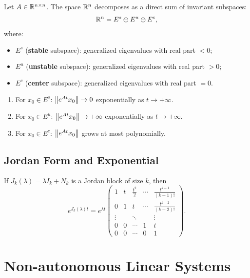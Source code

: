 \begin{theorem}
Let $A \in \mathbb{R}^{n \times n}$. The space $\mathbb{R}^n$ decomposes as a direct sum
of invariant subspaces:
\[
    \mathbb{R}^n = E^s \oplus E^u \oplus E^c,
\]
where:
\begin{itemize}
    \item $E^s$ (\textbf{stable} subspace): generalized eigenvalues with
    real part $< 0$;
    \item $E^u$ (\textbf{unstable} subspace): generalized eigenvalues with
    real part $> 0$;
    \item $E^c$ (\textbf{center} subspace): generalized eigenvalues with
    real part $= 0$.
\end{itemize}
\end{theorem}

\begin{proposition}
\begin{enumerate}
    \item For $x_0 \in E^s$: $\left\| e^{At} x_0 \right\| \to 0$ exponentially as
    $t \to +\infty$.
    \item For $x_0 \in E^u$: $\left\| e^{At} x_0 \right\| \to +\infty$ exponentially
    as $t \to +\infty$.
    \item For $x_0 \in E^c$: $\left\| e^{At} x_0 \right\|$ grows at most polynomially.
\end{enumerate}
\end{proposition}

\subsection{Jordan Form and Exponential}

\begin{proposition}
If $J_k(\lambda) = \lambda I_k + N_k$ is a Jordan block of size $k$, then
\[
    e^{J_k(\lambda)t} = e^{\lambda t}
    \begin{pmatrix}
        1 & t & \frac{t^2}{2} & \cdots & \frac{t^{k-1}}{(k-1)!} \\
        0 & 1 & t & \cdots & \frac{t^{k-2}}{(k-2)!} \\
        \vdots & & \ddots & & \vdots \\
        0 & 0 & \cdots & 1 & t \\
        0 & 0 & \cdots & 0 & 1
    \end{pmatrix}.
\]
\end{proposition}

\section{Non-autonomous Linear Systems}

